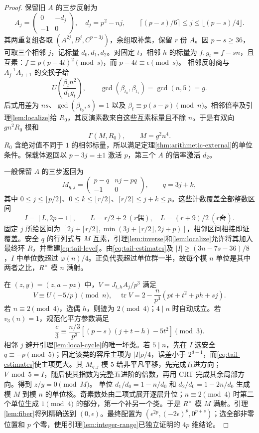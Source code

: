 \begin{proof}
保留旧 $A$ 的三步反射为
\[
A_j=\begin{pmatrix}0&-d_j\\-1&0\end{pmatrix},\quad d_j=p^2-nj,\qquad
\lceil(p-s)/6\rceil\le j\le\lfloor(p-s)/4\rfloor.
\]
其两重复组各取 $(A^{2j},B^j,C^{p-3j})$，余组取补集，保留 $r$ 份 $A$。因 $p-s\ge36$，可取三个相邻 $j$，记标量 $d_0,d_1,d_2$。对固定 $t$，相邻 $h$ 的标量为 $f,g_t=f-sn$，且互素：$f\equiv p(p-4t)^2\pmod s$，而 $p-4t\equiv\epsilon\pmod s$。
相邻反射商与 $A_j^{-1}A_{j+1}$ 的交换子给
\[
U\left(\frac{\beta_t n^2}{d_1g_t}\right),\qquad
\gcd(\beta_{t_0},\beta_{t_1})=\gcd(n,5)=g.
\]
后式用差为 $ns$、$\gcd(\beta_{t_0},s)=1$ 以及 $\beta_t\equiv p(s-p)\pmod n$。相邻倍率及引理\ref{lem:localize}给 $R_0$，其反演素数来自这些互素标量且不除 $n$。于是有双向 $gn^2R_0$ 根和
\begin{equation}\label{eq:tail-level}
\Gamma(M,R_0),\qquad M=g^2n^4.
\end{equation}
$R_0$ 含绝对值不同于 $1$ 的相邻标量，所以满足定理\ref{thm:arithmetic-external}的单位条件。保载体返回以 $p-3j=\pm1$ 激活 $p$，第三个 $A$ 的倍率激活 $d_2$。

一般保留 $A$ 的三步返回为
\[
M_{q,j}=\begin{pmatrix}p-q&nj-pq\\-1&0\end{pmatrix},\qquad q=3j+k,
\]
其中 $0\le j\le\lfloor p/2\rfloor$、$0\le k\le\lfloor r/2\rfloor$、$\lceil r/2\rceil\le j+k\le p$。这些计数覆盖全部整数区间
\[
I=[L,2p-1],\qquad L=r/2+2\ (r\text{偶}),\quad L=(r+9)/2\ (r\text{奇}).
\]
固定 $j$ 所给区间为 $[2j+\lceil r/2\rceil,\min(3j+\lfloor r/2\rfloor,2j+p)]$，相邻区间相接即证覆盖。安全 $q$ 的行列式与 $M$ 互素，引理\ref{lem:inverse}和\ref{lem:localize}允许将其加入最终环 $R$，并重建\eqref{eq:tail-level}。由\eqref{eq:tail-estimates}及 $|I|\ge(3n-7s-36)/8$，$I$ 中单位数超过 $\varphi(n)/4$。正负代表超过单位群一半，故每个模 $n$ 单位是其中两者之比，$R^\times$ 模 $n$ 满射。

在 $(z,y)=(z,a+pz)$ 中，$V=J_{t,h}A_j/p^3$ 满足
\[
V\equiv U(-5/p)\pmod n,\quad
\operatorname{tr}V=2-\frac n{p^3}(pt+t^2+ph+sj).
\]
若 $n\equiv2\pmod4$，选偶 $h$，则迹为 $2\pmod4$；$4\mid n$ 时自动成立。若 $v_3(n)=1$，规范化平方参数满足
\[
\frac c3\equiv\frac{n/3}{p^3}[(p-s)(j+t-h)-5t^2]\pmod3.
\]
相邻 $j$ 避开引理\ref{lem:local-cycle}的唯一坏类。若 $5\mid n$，先在 $I$ 选安全 $q\equiv-p\pmod5$；固定该类的容斥主项为 $|I|\rho/4$，误差小于 $2^{d-1}$，而\eqref{eq:tail-estimates}使主项更大。其 $M_{q,j}$ 模 $5$ 给非平凡平移，先完成五进方向；$V\bmod5=I$，随后使其指数为完整五进阶的倍数，再用 CRT 完成其余局部方向。得到 $z/y=0\pmod M$。
单位 $d_1/d_0=1-n/d_0$ 和 $d_2/d_0=1-2n/d_0$ 生成模 $M$ 到模 $n$ 的单位核。奇素数处由二项式展开逐层升位；$n\equiv2\pmod4$ 时第二个单位生成 $1\pmod4$ 的部分，第一个补另一个类。于是 $R^\times$ 模 $M$ 满射。引理\ref{lem:fiber}将列精确送到 $(0,\epsilon)$。最终配置为 $(\epsilon^{2p},(-2\epsilon)^p,0^{p+s})$；选全部非零位置和 $p$ 个零，使用引理\ref{lem:integer-range}已独立证明的 $4p$ 维结论。
\end{proof}

